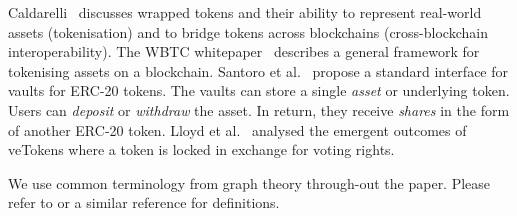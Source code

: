 Caldarelli~\cite{caldarelli-21} discusses wrapped tokens and their
ability to represent real-world assets (tokenisation) and to bridge
tokens across blockchains (cross-blockchain interoperability).  The
WBTC whitepaper~\cite{kyber-et-al-xx} describes a general framework
for tokenising assets on a blockchain.  Santoro et
al.~\cite{santoro-et-al-22} propose a standard interface for vaults
for ERC-20 tokens.  The vaults can store a single \textit{asset} or
underlying token.  Users can \textit{deposit} or \textit{withdraw} the
asset.  In return, they receive \textit{shares} in the form of another
ERC-20 token.  Lloyd et al.~\cite{lloyd-et-al-23} analysed the
emergent outcomes of veTokens where a token is locked in exchange for
voting rights.

We use common terminology from graph theory through-out the paper.
Please refer to \cite{diestel-17} or a similar reference for
definitions.
